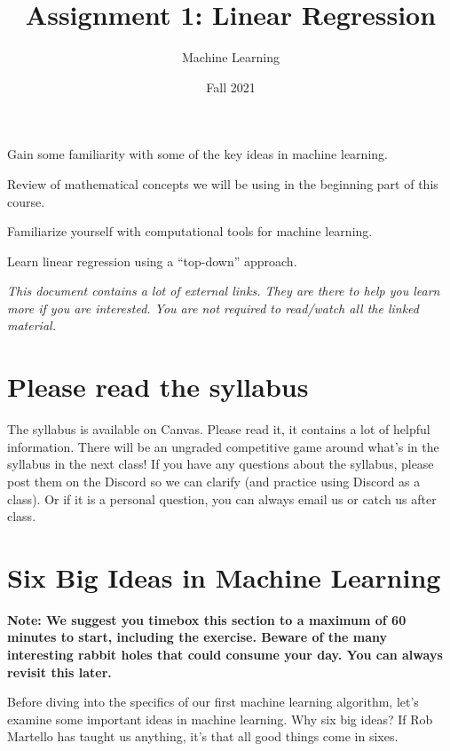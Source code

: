 \documentclass[assignment01_Solutions]{subfiles}
\title{Assignment 1: Linear Regression}
\author{Machine Learning}
\date{Fall 2021}
\begin{document}
\maketitle
\thispagestyle{firstpage}


\begin{learningobjectives}
\bi
\item Gain some familiarity with some of the key ideas in machine learning.
\item Review of mathematical concepts we will be using in the beginning part of this course.
\item Familiarize yourself with computational tools for machine learning.
\item Learn linear regression using a ``top-down'' approach.
\ei
\end{learningobjectives}

\emph{This document contains a lot of external links. They are there to help you learn more if you are interested. You are not required to read/watch all the linked material.}

\section{Please read the syllabus}
The syllabus is available on Canvas. Please read it, it contains a lot of helpful information. There will be an ungraded competitive game around what's in the syllabus in the next class! If you have any questions about the syllabus, please post them on the Discord so we can clarify (and practice using Discord as a class). Or if it is a personal question, you can always email us or catch us after class.

\section{Six Big Ideas in Machine Learning}
\textbf{Note: We suggest you timebox this section to a maximum of 60 minutes to start, including the exercise. Beware of the many interesting rabbit holes that could consume your day. You can always revisit this later.}

Before diving into the specifics of our first machine learning algorithm, let's examine some important ideas in machine learning.  Why six big ideas?  If Rob Martello has taught us anything, it's that all good things come in sixes.
\end{document}
